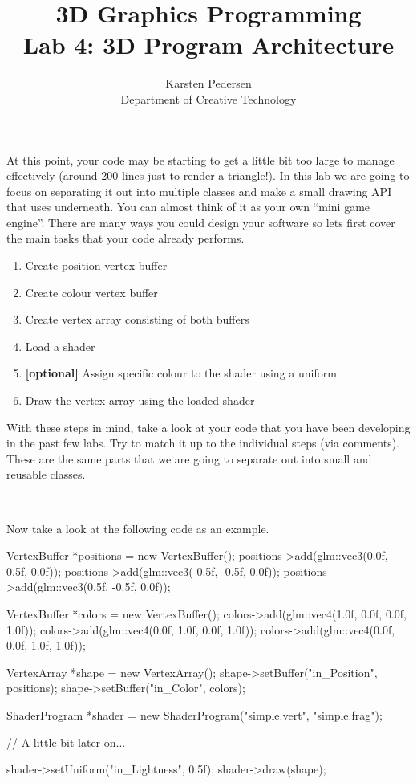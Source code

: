 \documentclass[10pt]{article}
\begin{document}
\title{3D Graphics Programming \\
  \large Lab 4: 3D Program Architecture}

\author{Karsten Pedersen\\ Department of Creative Technology}
\maketitle

At this point, your code may be starting to get a little bit too large
to manage effectively (around 200 lines just to render a triangle!). In
this lab we are going to focus on separating it out into multiple classes
and make a small drawing API that uses  underneath. You
can almost think of it as your own ``mini game engine''.  There are many
ways you could design your software so lets first cover the main tasks
that your code already performs.

\begin{enumerate}
  \item Create position vertex buffer
  \item Create colour vertex buffer
  \item Create vertex array consisting of both buffers
  \item Load a shader
  \item \textbf{[optional]} Assign specific colour to the shader using a uniform
  \item Draw the vertex array using the loaded shader
\end{enumerate}

With these steps in mind, take a look at your code that you have been
developing in the past few labs. Try to match it up to the individual
steps (via comments). These are the same parts that we are going to
separate out into small and reusable classes.

\

Now take a look at the following code as an example.

\begin{Code}
  VertexBuffer *positions = new VertexBuffer();
  positions->add(glm::vec3(0.0f, 0.5f, 0.0f));
  positions->add(glm::vec3(-0.5f, -0.5f, 0.0f));
  positions->add(glm::vec3(0.5f, -0.5f, 0.0f));

  VertexBuffer *colors = new VertexBuffer();
  colors->add(glm::vec4(1.0f, 0.0f, 0.0f, 1.0f));
  colors->add(glm::vec4(0.0f, 1.0f, 0.0f, 1.0f));
  colors->add(glm::vec4(0.0f, 0.0f, 1.0f, 1.0f));

  VertexArray *shape = new VertexArray();
  shape->setBuffer("in_Position", positions);
  shape->setBuffer("in_Color", colors);

  ShaderProgram *shader = new ShaderProgram("simple.vert", "simple.frag");

  // A little bit later on...

  shader->setUniform("in_Lightness", 0.5f);
  shader->draw(shape);
\end{Code}
\end{document}
